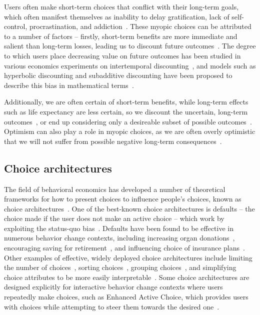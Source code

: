 Users often make short-term choices that conflict with their long-term goals, which often manifest themselves as inability to delay gratification, lack of self-control, procrastination, and addiction~\cite{loewenstein1992choice, shu2010procrastination}. These myopic choices can be attributed to a number of factors -- firstly, short-term benefits are more immediate and salient than long-term losses, leading us to discount future outcomes~\cite{ainslie2001breakdown, loewenstein1992choice, soman2005psychology}. The degree to which users place decreasing value on future outcomes has been studied in various economics experiments on intertemporal discounting~\cite{weber2007asymmetric}, and models such as hyperbolic discounting and subadditive discounting have been proposed to describe this bias in mathematical terms~\cite{ainslie1992hyperbolic, rubinstein2003economics, read2001time}.

Additionally, we are often certain of short-term benefits, while long-term effects such as life expectancy are less certain, so we discount the uncertain, long-term outcomes~\cite{payne2013life}, or end up considering only a desireable subset of possible outcomes~\cite{shu2008future, koehler1991explanation}. Optimism can also play a role in myopic choices, as we are often overly optimistic that we will not suffer from possible negative long-term consequences~\cite{kahneman1993timid, zauberman2005resource}.

\subsection{Choice architectures}

The field of behavioral economics has developed a number of theoretical frameworks for how to present choices to influence people's choices, known as choice architectures~\cite{thaler1980toward, thaler2009nudge, johnson2012beyond}. One of the best-known choice architectures is defaults -- the choice made if the user does not make an active choice -- which work by exploiting the status-quo bias~\cite{samuelson1988status}. Defaults have been found to be effective in numerous behavior change contexts, including increasing organ donations~\cite{johnson2003defaults}, encouraging saving for retirement~\cite{cronqvist2004design, madrian2001power}, and influencing choice of insurance plans~\cite{johnson1993framing}. Other examples of effective, widely deployed choice architectures include limiting the number of choices~\cite{cronqvist2004design, kling2008misperception}, sorting choices~\cite{lynch2000wine}, grouping choices~\cite{fox2005subjective}, and simplifying choice attributes to be more easily interpretable~\cite{peters2009bringing, soll2013consumer}. Some choice architectures are designed explicitly for interactive behavior change contexts where users repeatedly make choices, such as Enhanced Active Choice, which provides users with choices while attempting to steer them towards the desired one~\cite{keller2011enhanced}.

